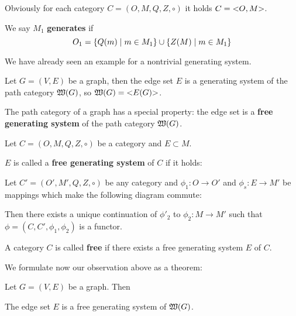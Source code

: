 Obviously for each category $C = (O, M, Q, Z, \circ)$ it holds $C =
\mbox{${<}{O},{M}{>}$}$.

\medskip
We say $M_1$ {\bf generates}  if 
\[ O_1 = \mbox{$\{Q(m) \mid m \in M_1\}$} \cup \mbox{$\{Z(M) \mid m \in M_1\}$} \]

We have already seen an example for a nontrivial generating system.

Let $G=(V,E)$ be a graph, then the edge set $E$ is a generating system of the
path category $\mbox{$\mathfrak{W}({G})$}$, so $\mbox{$\mathfrak{W}({G})$} = \mbox{${<}{E(G)}{>}$}$.

The path category of a graph has a special property: the edge set is a {\bf free
generating system} of the path category $\mbox{$\mathfrak{W}({G})$}$.

\bigskip
\begin{definition}
Let $C = (O, M, Q, Z, \circ)$ be a category and $E \subset M$.

$E$ is called a {\bf free generating system} of $C$ if it holds:

Let $C' = (O', M', Q, Z, \circ)$ be any category and $\phi_1: O \to O'$ and
$\phi_s : E \to M'$ be mappings which make the following diagram commute:

\begin{center}
\end{center}

Then there exists a unique continuation of $\phi'_2$ to $\phi_2 : M \to M'$ such
that $\phi = (C, C', \phi_1, \phi_2)$ is a functor.
\end{definition}

\bigskip
\begin{definition}
A category $C$ is called {\bf free} if there exists a free generating system $E$
of $C$.
\end{definition}

We formulate now our observation above as a theorem:

\begin{theorem}
Let $G=(V, E)$ be a graph. Then
\begin{center}
The edge set $E$ is a free generating system of $\mbox{$\mathfrak{W}({G})$}$.
\end{center}
\end{theorem}


